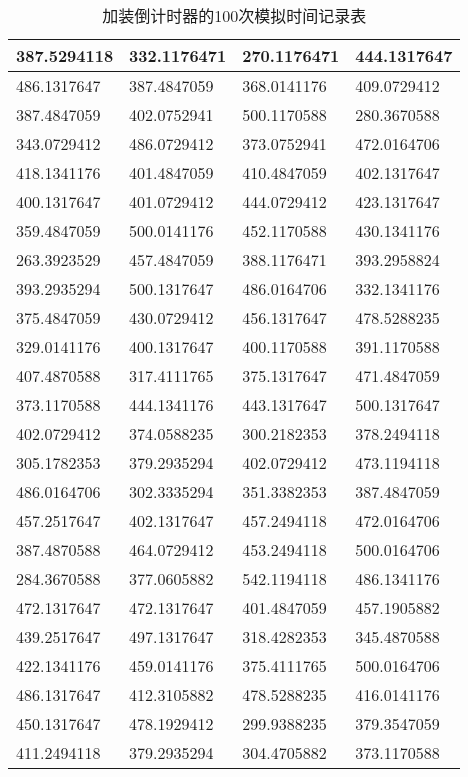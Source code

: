 \documentclass[a4paper,12pt]{article}
\numberwithin{equation}{section}
\begin{document}
	\begin{table}[H]
		\centering
		\caption{加装倒计时器的100次模拟时间记录表}
		\begin{tabular}{|l|l|l|l|}
			\hline
			387.5294118 & 332.1176471 & 270.1176471 & 444.1317647 \\ \hline
			486.1317647 & 387.4847059 & 368.0141176 & 409.0729412 \\ \hline
			387.4847059 & 402.0752941 & 500.1170588 & 280.3670588 \\ \hline
			343.0729412 & 486.0729412 & 373.0752941 & 472.0164706 \\ \hline
			418.1341176 & 401.4847059 & 410.4847059 & 402.1317647 \\ \hline
			400.1317647 & 401.0729412 & 444.0729412 & 423.1317647 \\ \hline
			359.4847059 & 500.0141176 & 452.1170588 & 430.1341176 \\ \hline
			263.3923529 & 457.4847059 & 388.1176471 & 393.2958824 \\ \hline
			393.2935294 & 500.1317647 & 486.0164706 & 332.1341176 \\ \hline
			375.4847059 & 430.0729412 & 456.1317647 & 478.5288235 \\ \hline
			329.0141176 & 400.1317647 & 400.1170588 & 391.1170588 \\ \hline
			407.4870588 & 317.4111765 & 375.1317647 & 471.4847059 \\ \hline
			373.1170588 & 444.1341176 & 443.1317647 & 500.1317647 \\ \hline
			402.0729412 & 374.0588235 & 300.2182353 & 378.2494118 \\ \hline
			305.1782353 & 379.2935294 & 402.0729412 & 473.1194118 \\ \hline
			486.0164706 & 302.3335294 & 351.3382353 & 387.4847059 \\ \hline
			457.2517647 & 402.1317647 & 457.2494118 & 472.0164706 \\ \hline
			387.4870588 & 464.0729412 & 453.2494118 & 500.0164706 \\ \hline
			284.3670588 & 377.0605882 & 542.1194118 & 486.1341176 \\ \hline
			472.1317647 & 472.1317647 & 401.4847059 & 457.1905882 \\ \hline
			439.2517647 & 497.1317647 & 318.4282353 & 345.4870588 \\ \hline
			422.1341176 & 459.0141176 & 375.4111765 & 500.0164706 \\ \hline
			486.1317647 & 412.3105882 & 478.5288235 & 416.0141176 \\ \hline
			450.1317647 & 478.1929412 & 299.9388235 & 379.3547059 \\ \hline
			411.2494118 & 379.2935294 & 304.4705882 & 373.1170588 \\ \hline
		\end{tabular}
	\end{table}
\end{document}
